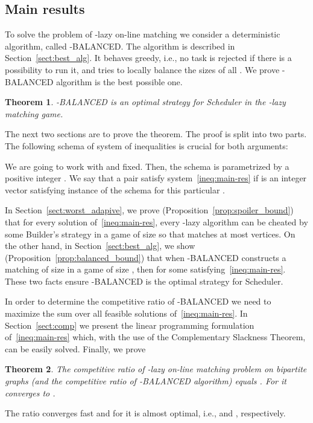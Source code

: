 \documentclass[12pt]{amsart}
\newtheorem{theorem}{Theorem}[section]
\theoremstyle{definition}
\newcommand{\Alg}[0]{\textsf{BALANCED}\xspace}
\newcommand{\Br}{Builder\xspace}
\newcommand{\Sr}{Scheduler\xspace}
\begin{document}
 

\subsection{Main results}
To solve the problem of -lazy on-line matching we consider a deterministic algorithm, called -\Alg{}.
The algorithm is described in Section~\ref{sect:best_alg}. 
It behaves greedy, i.e., no task is rejected if there is a possibility to run it, and tries to locally balance the sizes of all .
We prove -\Alg{} algorithm is the best possible one.
\begin{theorem}\label{thm:optimal-bal}
  -\Alg{} is an optimal strategy for \Sr in the -lazy matching game.
\end{theorem}

The next two sections are to prove the theorem.
The proof is split into two parts.
The following schema of system of inequalities is crucial for both arguments:



We are going to work with  and  fixed. 
Then, the schema is parametrized by a positive integer .
We say that a pair  satisfy system~\eqref{ineq:main-res} if  is an integer vector satisfying instance of the schema for this particular .

In Section~\ref{sect:worst_adapive}, we prove (Proposition~\ref{prop:spoiler_bound}) that for every solution  of~\eqref{ineq:main-res}, every -lazy algorithm  can be cheated by some \Br's strategy in a game of size  so that  matches at most  vertices.
On the other hand, in Section~\ref{sect:best_alg}, we show (Proposition~\ref{prop:balanced_bound}) that when -\Alg{} constructs a matching of size  in a game of size , then  for some  satisfying~\eqref{ineq:main-res}.
These two facts ensure -\Alg{} is the optimal strategy for \Sr.

In order to determine the competitive ratio of -\Alg{} we need to maximize the sum  over all feasible solutions  of~\eqref{ineq:main-res}.
In Section~\ref{sect:comp} we present the linear programming formulation of~\eqref{ineq:main-res} which, with the use of the Complementary Slackness Theorem, can be easily solved. Finally, we prove
\begin{theorem}\label{thm:ratio}
 The competitive ratio of -lazy on-line matching problem on bipartite graphs 
 (and the competitive ratio of 
 -\Alg{} algorithm)  equals
. For  it converges to .
\end{theorem}
The ratio converges fast and for  it is almost optimal, i.e.,  and , respectively.
\end{document}
